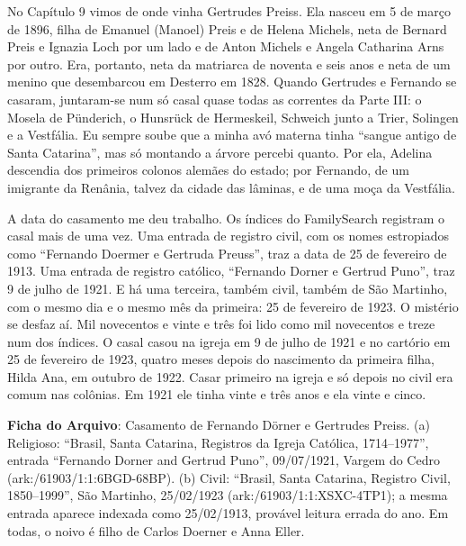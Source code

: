 \documentclass[
  brazilian,
  11pt,
  openany]{book}
\begin{document}
No Capítulo 9 vimos de onde vinha Gertrudes Preiss. Ela nasceu em 5 de
março de 1896, filha de Emanuel (Manoel) Preis e de Helena Michels, neta
de Bernard Preis e Ignazia Loch por um lado e de Anton Michels e Angela
Catharina Arns por outro. Era, portanto, neta da matriarca de noventa e
seis anos e neta de um menino que desembarcou em Desterro em 1828.
Quando Gertrudes e Fernando se casaram, juntaram-se num só casal quase
todas as correntes da Parte III: o Mosela de Pünderich, o Hunsrück de
Hermeskeil, Schweich junto a Trier, Solingen e a Vestfália. Eu sempre
soube que a minha avó materna tinha ``sangue antigo de Santa Catarina'',
mas só montando a árvore percebi quanto. Por ela, Adelina descendia dos
primeiros colonos alemães do estado; por Fernando, de um imigrante da
Renânia, talvez da cidade das lâminas, e de uma moça da Vestfália.

A data do casamento me deu trabalho. Os índices do FamilySearch
registram o casal mais de uma vez. Uma entrada de registro civil, com os
nomes estropiados como ``Fernando Doermer e Gertruda Preuss'', traz a
data de 25 de fevereiro de 1913. Uma entrada de registro católico,
``Fernando Dorner e Gertrud Puno'', traz 9 de julho de 1921. E há uma
terceira, também civil, também de São Martinho, com o mesmo dia e o
mesmo mês da primeira: 25 de fevereiro de 1923. O mistério se desfaz aí.
Mil novecentos e vinte e três foi lido como mil novecentos e treze num
dos índices. O casal casou na igreja em 9 de julho de 1921 e no cartório
em 25 de fevereiro de 1923, quatro meses depois do nascimento da
primeira filha, Hilda Ana, em outubro de 1922. Casar primeiro na igreja
e só depois no civil era comum nas colônias. Em 1921 ele tinha vinte e
três anos e ela vinte e cinco.

\begin{ficha}

\textbf{Ficha do Arquivo}: Casamento de Fernando Dörner e Gertrudes
Preiss. (a) Religioso: ``Brasil, Santa Catarina, Registros da Igreja
Católica, 1714--1977'', entrada ``Fernando Dorner and Gertrud Puno'',
09/07/1921, Vargem do Cedro (ark:/61903/1:1:6BGD-68BP). (b) Civil:
``Brasil, Santa Catarina, Registro Civil, 1850--1999'', São Martinho,
25/02/1923 (ark:/61903/1:1:XSXC-4TP1); a mesma entrada aparece indexada
como 25/02/1913, provável leitura errada do ano. Em todas, o noivo é
filho de Carlos Doerner e Anna Eller.

\end{ficha}
\end{document}
